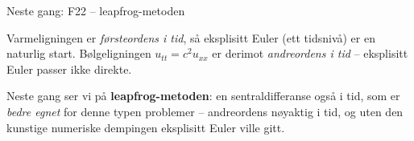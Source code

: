 \documentclass[11pt,aspectratio=169]{beamer}
\begin{document}
\begin{frame}{Neste gang: F22 -- leapfrog-metoden}
\begin{nestefb}
Varmeligningen er \emph{førsteordens i tid}, så eksplisitt Euler (ett tidsnivå) er en naturlig start. Bølgeligningen $u_{tt}=c^2u_{xx}$ er derimot \emph{andreordens i tid} -- eksplisitt Euler passer ikke direkte.

Neste gang ser vi på \textbf{leapfrog-metoden}: en sentraldifferanse også i tid, som er \emph{bedre egnet} for denne typen problemer -- andreordens nøyaktig i tid, og uten den kunstige numeriske dempingen eksplisitt Euler ville gitt.
\end{nestefb}
\end{frame}
\end{document}
